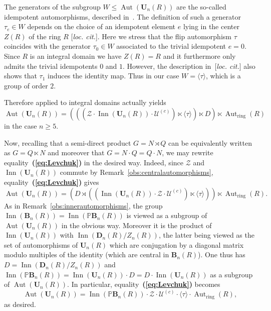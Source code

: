 \documentclass[a4paper,11pt]{amsart}
\numberwithin{equation}{section}
\theoremstyle{plain}
\theoremstyle{definition}
\newcommand{\anel}[1]{#1_{\text{ring}}} %
\newcommand{\mbU}{\mathbf{U}} %
\newcommand{\mbD}{\mathbf{D}} %
\newcommand{\mbB}{\mathbf{B}} %
\newcommand{\PB}{\mathbb{P}\mathbf{B}} %
\newcommand{\gera}[1]{\langle {#1} \rangle}
\newcommand{\mc}{\mathcal}
\newcommand{\bref}[1]{{\bf(\ref{#1})}} %
\DeclareMathOperator{\Aut}{Aut}
\DeclareMathOperator{\Inn}{Inn}
\begin{document}
The generators of the subgroup $W \leq \Aut(\mbU_n(R))$ are the so-called idempotent automorphisms, described in~\cite[65]{LevchukOriginal}. The definition of such a generator $\tau_e \in W$ depends on the choice of an idempotent element $e$ lying in the center $Z(R)$ of the ring $R$ [\emph{loc. cit.}]. Here we stress that the flip automorphism $\tau$ coincides with the generator $\tau_0 \in W$ associated to the trivial idempotent $e = 0$. Since $R$ is an integral domain we have $Z(R) = R$ and it furthermore only admits the trivial idempotents $0$ and $1$. However, the description in~[\emph{loc. cit.}] also shows that $\tau_1$ induces the identity map. Thus in our case $W = \gera{\tau}$, which is a group of order $2$.

Therefore \cite[Corollary~3]{LevchukOriginal} applied to integral domains actually yields
\begin{equation} \label{eq:Levchuk} \Aut(\mbU_n(R)) = (((\mc{Z} \cdot \Inn(\mbU_n(R)) \cdot \mc{U}^{(c)}) \ltimes \gera{\tau}) \ltimes D) \ltimes \anel{\Aut}(R) \end{equation}
in the case $n \geq 5$.

Now, recalling that a semi-direct product $G = N \rtimes Q$ can be equivalently written as $G = Q \ltimes N$ and moreover that $G = N \cdot Q = Q \cdot N$, we may rewrite equality~\bref{eq:Levchuk} in the desired way. Indeed, since $\mc{Z}$ and $\Inn(\mbU_n(R))$ commute by Remark~\ref{obs:centralautomorphisms}, equality~\bref{eq:Levchuk} gives 
\[ \Aut(\mbU_n(R)) = ( D \rtimes ((\Inn(\mbU_n(R)) \cdot \mc{Z} \cdot \mc{U}^{(c)}) \ltimes \gera{\tau}) ) \ltimes \anel{\Aut}(R). \]
As in Remark~\ref{obs:innerautomorphisms}, the group $\Inn(\mbB_n(R)) = \Inn(\PB_n(R))$ is viewed as a subgroup of $\Aut(\mbU_n(R))$ in the obvious way. Moreover it is the product of $\Inn(\mbU_n(R))$ with $\Inn(\mbD_n(R) / Z_n(R))$, the latter being viewed as the set of automorphisms of $\mbU_n(R)$ which are conjugation by a diagonal matrix modulo multiples of the identity (which are central in $\mbB_n(R)$). One thus has $D = \Inn(\mbD_n(R) / Z_n(R))$ and $\Inn(\PB_n(R)) = \Inn(\mbU_n(R)) \cdot D = D \cdot \Inn(\mbU_n(R))$ as a subgroup of $\Aut(\mbU_n(R))$. In particular, equality~\bref{eq:Levchuk} becomes 
\[\Aut(\mbU_n(R)) = \Inn(\PB_n(R)) \cdot \mc{Z} \cdot \mc{U}^{(c)} \cdot \gera{\tau} \cdot \anel{\Aut}(R),\]
as desired.
\end{document}
